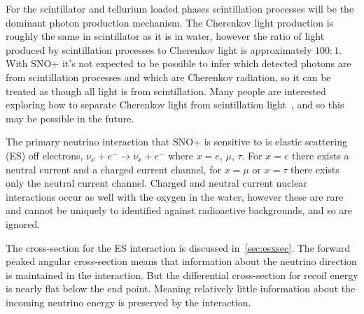 For the scintillator and tellurium loaded phases scintillation processes will be
the dominant photon production mechanism.
The Cherenkov light production is roughly the same in scintillator as it is in
water, however the ratio of light produced by scintillation processes to Cherenkov
light is approximately $100:1$.
With SNO+ it's not expected to be possible to infer which detected photons are
from scintillation processes and which are Cherenkov radiation, so it can be treated
as though all light is from scintillation.
Many people are interested exploring how to separate Cherenkov light from scintillation
light~\citep{tanners_paper,javi_chess, winslow_directionality},
and so this may be possible in the future.

The primary neutrino interaction that SNO+ is sensitive to is elastic scattering (ES)
off electrons,
$\nu_{x} + e^{-} \rightarrow \nu_{x} + e^{-}$
where $x=e$, $\mu$, $\tau$.
For $x=e$ there exists a neutral current and a charged current channel,
for $x=\mu$ or $x=\tau$ there exists only the neutral current channel.
Charged and neutral current nuclear interactions occur as well with the oxygen in the water,
however these are rare and cannot be uniquely to identified against radioactive
backgrounds, and so are ignored.

The cross-section for the ES interaction is discussed in~\ref{sec:esxsec}.
The forward peaked angular cross-section means that information about the
neutrino direction is maintained in the interaction.
But the differential cross-section for recoil energy is nearly flat below the
end point. Meaning relatively little information about the incoming neutrino energy
is preserved by the interaction.



